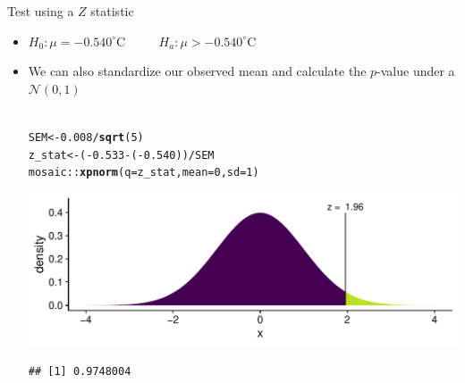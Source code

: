 \documentclass[10pt]{beamer}\usepackage[]{graphicx}\usepackage[]{color}
\makeatletter
\def\maxwidth{ %
  \ifdim\Gin@nat@width>\linewidth
    \linewidth
  \else
    \Gin@nat@width
  \fi
}
\newcommand{\hlnum}[1]{\textcolor[rgb]{0.686,0.059,0.569}{#1}}%
\newcommand{\hlopt}[1]{\textcolor[rgb]{0,0,0}{#1}}%
\newcommand{\hlstd}[1]{\textcolor[rgb]{0.345,0.345,0.345}{#1}}%
\newcommand{\hlkwb}[1]{\textcolor[rgb]{0.69,0.353,0.396}{#1}}%
\newcommand{\hlkwc}[1]{\textcolor[rgb]{0.333,0.667,0.333}{#1}}%
\newcommand{\hlkwd}[1]{\textcolor[rgb]{0.737,0.353,0.396}{\textbf{#1}}}%
\newenvironment{kframe}{%
 \def\at@end@of@kframe{}%
 \ifinner\ifhmode%
  \def\at@end@of@kframe{\end{minipage}}%
  \begin{minipage}{\columnwidth}%
 \fi\fi%
 \def\FrameCommand##1{\hskip\@totalleftmargin \hskip-\fboxsep
 \colorbox{shadecolor}{##1}\hskip-\fboxsep
     \hskip-\linewidth \hskip-\@totalleftmargin \hskip\columnwidth}%
 \MakeFramed {\advance\hsize-\width
   \@totalleftmargin\z@ \linewidth\hsize
   \@setminipage}}%
 {\par\unskip\endMakeFramed%
 \at@end@of@kframe}
\newenvironment{knitrout}{}{} %
\makeatother
\begin{document}
\begin{frame}[fragile]{Test using a $Z$ statistic}
	\begin{itemize}
		\setlength\itemsep{.7em}
		\item   $H_0: \mu =  -0.540^{\circ}$C $\qquad$  $H_a: \mu >  -0.540^{\circ}$C
		
		\item We can also standardize our observed mean and calculate the $p$-value under a $\mathcal{N}(0,1)$ \\ \ \\
		
\begin{knitrout}\tiny
{}\color{fgcolor}\begin{kframe}
\begin{alltt}
\hlstd{SEM} \hlkwb{<-} \hlnum{0.008}\hlopt{/}\hlkwd{sqrt}\hlstd{(}\hlnum{5}\hlstd{)}
\hlstd{z_stat} \hlkwb{<-} \hlstd{(}\hlopt{-}\hlnum{0.533} \hlopt{-} \hlstd{(}\hlopt{-}\hlnum{0.540}\hlstd{))} \hlopt{/} \hlstd{SEM}
\hlstd{mosaic}\hlopt{::}\hlkwd{xpnorm}\hlstd{(}\hlkwc{q} \hlstd{= z_stat,} \hlkwc{mean} \hlstd{=} \hlnum{0}\hlstd{,} \hlkwc{sd} \hlstd{=} \hlnum{1}\hlstd{)}
\end{alltt}


{\ttfamily\noindent\itshape\color{messagecolor}{\#\# }}

{\ttfamily\noindent\itshape{}}

{\ttfamily\noindent\itshape\color{messagecolor}{\#\# 	P(X <= 1.957) = P(Z <= 1.957) = 0.9748}}

{\ttfamily\noindent\itshape\color{messagecolor}{\#\# 	P(X > \ 1.957) = P(Z > \ 1.957) = 0.0252}}

{\ttfamily\noindent\itshape\color{messagecolor}{\#\# }}\end{kframe}

{\centering \includegraphics[width=\maxwidth]{figure/unnamed-chunk-3-1} 

}


\begin{kframe}\begin{verbatim}
## [1] 0.9748004
\end{verbatim}
\end{kframe}
\end{knitrout}
		
	\end{itemize}
\end{frame}
\end{document}
